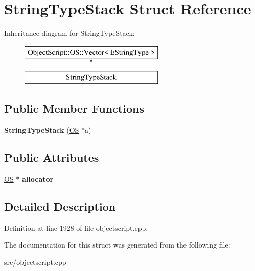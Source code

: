 \hypertarget{struct_string_type_stack}{}\section{String\+Type\+Stack Struct Reference}
\label{struct_string_type_stack}
Inheritance diagram for String\+Type\+Stack\+:\begin{figure}[H]
\begin{center}
\leavevmode
\includegraphics[height=2.000000cm]{struct_string_type_stack}
\end{center}
\end{figure}
\subsection*{Public Member Functions}
\begin{DoxyCompactItemize}
\item 
{\bfseries String\+Type\+Stack} (\hyperlink{class_object_script_1_1_o_s}{OS} $\ast$a)\hypertarget{struct_string_type_stack_a76338bada0dc2dc471b7f81340b074c2}{}\label{struct_string_type_stack_a76338bada0dc2dc471b7f81340b074c2}

\end{DoxyCompactItemize}
\subsection*{Public Attributes}
\begin{DoxyCompactItemize}
\item 
\hyperlink{class_object_script_1_1_o_s}{OS} $\ast$ {\bfseries allocator}\hypertarget{struct_string_type_stack_ad4e1ba3d259504a68a4d4fe84c3f6446}{}\label{struct_string_type_stack_ad4e1ba3d259504a68a4d4fe84c3f6446}

\end{DoxyCompactItemize}


\subsection{Detailed Description}


Definition at line 1928 of file objectscript.\+cpp.



The documentation for this struct was generated from the following file\+:\begin{DoxyCompactItemize}
\item 
src/objectscript.\+cpp\end{DoxyCompactItemize}
